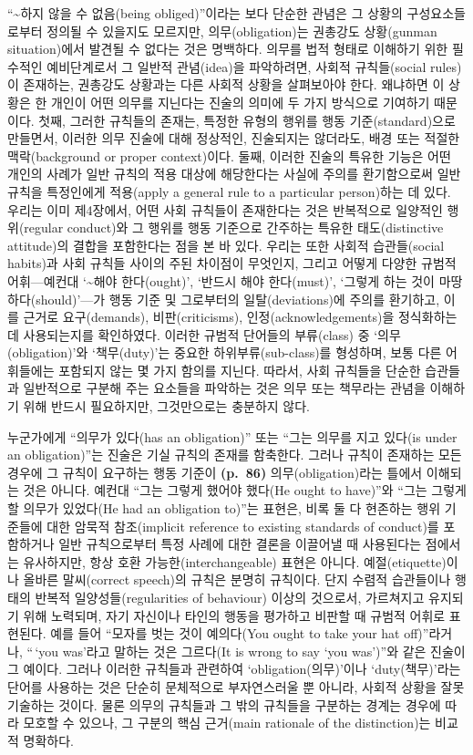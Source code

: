 “\textasciitilde 하지 않을 수 없음(being obliged)”이라는 보다 단순한
관념은 그 상황의 구성요소들로부터 정의될 수 있을지도 모르지만,
의무(obligation)는 권총강도 상황(gunman situation)에서 발견될 수 없다는
것은 명백하다. 의무를 법적 형태로 이해하기 위한 필수적인 예비단계로서 그
일반적 관념(idea)을 파악하려면, 사회적 규칙들(social rules)이 존재하는,
권총강도 상황과는 다른 사회적 상황을 살펴보아야 한다. 왜냐하면 이 상황은
한 개인이 어떤 의무를 지닌다는 진술의 의미에 두 가지 방식으로 기여하기
때문이다. 첫째, 그러한 규칙들의 존재는, 특정한 유형의 행위를 행동
기준(standard)으로 만들면서, 이러한 의무 진술에 대해 정상적인,
진술되지는 않더라도, 배경 또는 적절한 맥락(background or proper
context)이다. 둘째, 이러한 진술의 특유한 기능은 어떤 개인의 사례가 일반
규칙의 적용 대상에 해당한다는 사실에 주의를 환기함으로써 일반 규칙을
특정인에게 적용(apply a general rule to a particular person)하는 데
있다. 우리는 이미 제4장에서, 어떤 사회 규칙들이 존재한다는 것은
반복적으로 일양적인 행위(regular conduct)와 그 행위를 행동 기준으로
간주하는 특유한 태도(distinctive attitude)의 결합을 포함한다는 점을 본
바 있다. 우리는 또한 사회적 습관들(social habits)과 사회 규칙들 사이의
주된 차이점이 무엇인지, 그리고 어떻게 다양한 규범적 어휘---예컨대
‘\textasciitilde 해야 한다(ought)’, ‘반드시 해야 한다(must)’, ‘그렇게
하는 것이 마땅하다(should)’---가 행동 기준 및 그로부터의
일탈(deviations)에 주의를 환기하고, 이를 근거로 요구(demands),
비판(criticisms), 인정(acknowledgements)을 정식화하는 데 사용되는지를
확인하였다. 이러한 규범적 단어들의 부류(class) 중 ‘의무(obligation)’와
‘책무(duty)’는 중요한 하위부류(sub-class)를 형성하며, 보통 다른
어휘들에는 포함되지 않는 몇 가지 함의를 지닌다. 따라서, 사회 규칙들을
단순한 습관들과 일반적으로 구분해 주는 요소들을 파악하는 것은 의무 또는
책무라는 관념을 이해하기 위해 반드시 필요하지만, 그것만으로는 충분하지
않다.

누군가에게 “의무가 있다(has an obligation)” 또는 “그는 의무를 지고
있다(is under an obligation)”는 진술은 기실 규칙의 존재를 함축한다.
그러나 규칙이 존재하는 모든 경우에 그 규칙이 요구하는 행동 기준이
\textbf{(p.~86)} 의무(obligation)라는 틀에서 이해되는 것은 아니다.
예컨대 “그는 그렇게 했어야 했다(He ought to have)”와 “그는 그렇게 할
의무가 있었다(He had an obligation to)”는 표현은, 비록 둘 다 현존하는
행위 기준들에 대한 암묵적 참조(implicit reference to existing standards
of conduct)를 포함하거나 일반 규칙으로부터 특정 사례에 대한 결론을
이끌어낼 때 사용된다는 점에서는 유사하지만, 항상 호환
가능한(interchangeable) 표현은 아니다. 예절(etiquette)이나 올바른
말씨(correct speech)의 규칙은 분명히 규칙이다. 단지 수렴적 습관들이나
행태의 반복적 일양성들(regularities of behaviour) 이상의 것으로서,
가르쳐지고 유지되기 위해 노력되며, 자기 자신이나 타인의 행동을 평가하고
비판할 때 규범적 어휘로 표현된다. 예를 들어 “모자를 벗는 것이
예의다(You ought to take your hat off)”라거나, “\,`you was'라고 말하는
것은 그르다(It is wrong to say `you was')”와 같은 진술이 그 예이다.
그러나 이러한 규칙들과 관련하여 ‘obligation(의무)’이나 ‘duty(책무)’라는
단어를 사용하는 것은 단순히 문체적으로 부자연스러울 뿐 아니라, 사회적
상황을 잘못 기술하는 것이다. 물론 의무의 규칙들과 그 밖의 규칙들을
구분하는 경계는 경우에 따라 모호할 수 있으나, 그 구분의 핵심 근거(main
rationale of the distinction)는 비교적 명확하다.

